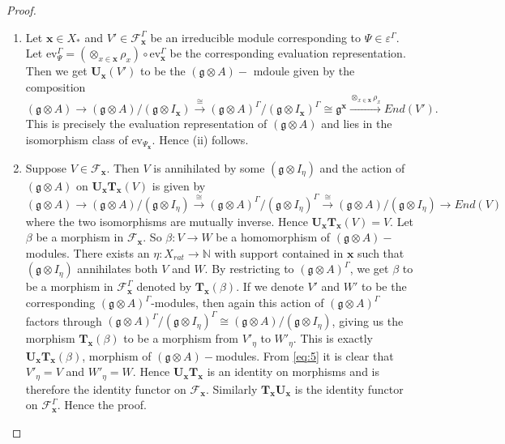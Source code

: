 \documentclass[10pt,a4paper]{amsart}
\newcommand{\g}{\mathfrak{g}}
\begin{document}
\begin{proof}
\begin{enumerate}[label=(\alph*)]
    \item Let $\textbf{x}\in X_{*}$ and $V'\in\mathcal{F}_{\textbf{x}}^{\Gamma}$ be an irreducible module  corresponding to $\Psi\in\varepsilon^{\Gamma}$. Let $\mbox{ev}_{\Psi}^{\Gamma}=(\otimes_{x\in\textbf{x}}\rho_{x})\circ\mbox{ev}_{\textbf{x}}^{\Gamma}$ be the corresponding evaluation representation. Then we get $\textbf{U}_{\textbf{x}}(V')$ to be the $(\g\otimes A)-$ mdoule given by the composition
    \begin{equation*}
        (\g\otimes A)\rightarrow(\g\otimes
        A)/(\g\otimes I_{\textbf{x}})\xrightarrow{\cong}(\g\otimes A)^{\Gamma}/(\g\otimes I_{\textbf{x}})^{\Gamma}\cong\g^{\textbf{x}}\xrightarrow{\otimes_{x\in\textbf{x}}\rho_{x}}End(V').
    \end{equation*}
    This is precisely the evaluation representation of $(\g\otimes A)$ and lies in the isomorphism class of $\mbox{ev}_{\Psi_\textbf{x}}$. Hence (ii) follows.
    \item Suppose $V\in \mathcal{F}_{\textbf{x}}$. Then $V$ is annihilated by some $(\g\otimes I_{\eta})$ and the action of $(\g\otimes A)$ on $\textbf{U}_{\textbf{x}}\textbf{T}_{\textbf{x}}(V)$ is given by
    \begin{equation*}
        (\g\otimes A)\rightarrow(\g\otimes A)/(\g\otimes I_{\eta})\xrightarrow{\cong}(\g\otimes A)^{\Gamma}/(\g\otimes I_{\eta})^{\Gamma}\xrightarrow{\cong}(\g\otimes A)/(\g\otimes I_{\eta})\rightarrow End(V)
    \end{equation*}
    where the two isomorphisms are mutually inverse. Hence $\textbf{U}_{\textbf{x}}\textbf{T}_{\textbf{x}}(V)=V$. Let $\beta$ be a morphism in $\mathcal{F}_{\textbf{x}}$. So $\beta:V\rightarrow W$ be a homomorphism of $(\g\otimes A)-$modules. There exists an $\eta: X_{rat}\rightarrow\mathbb{N}$ with support contained in $\textbf{x}$ such that $(\g\otimes I_{\eta})$ annihilates both $V$ and $W$. By restricting to $(\g\otimes A)^{\Gamma}$, we get $\beta$ to be a morphism in $\mathcal{F}_{\textbf{x}}^{\Gamma}$ denoted by $\textbf{T}_{\textbf{x}}(\beta)$. If we denote $V'$ and $W'$ to be the corresponding $(\g\otimes A)^{\Gamma}$-modules, then again this action of $(\g\otimes A)^\Gamma$ factors through $(\g\otimes A)^{\Gamma}/(\g\otimes I_{\eta})^{\Gamma}\cong(\g\otimes A)/(\g\otimes I_{\eta})$, giving us the morphism $\textbf{T}_{\textbf{x}}(\beta)$ to be a morphism from $V'_{\eta}$ to $W'_{\eta}$. This is exactly $\textbf{U}_{\textbf{x}}\textbf{T}_{\textbf{x}}(\beta)$, morphism of $(\g\otimes A)-$modules. From \eqref{eq:5} it is clear that $V'_{\eta}=V$ and $W'_{\eta}=W$. Hence $\textbf{U}_{\textbf{x}}\textbf{T}_{\textbf{x}}$ is an identity on morphisms and is therefore the identity functor on $\mathcal{F}_{\textbf{x}}$. Similarly $\textbf{T}_{\textbf{x}}\textbf{U}_{\textbf{x}}$ is the identity functor on $\mathcal{F}^{\Gamma}_{\textbf{x}}$. Hence the proof.   
\end{enumerate}
\end{proof}
\end{document}
